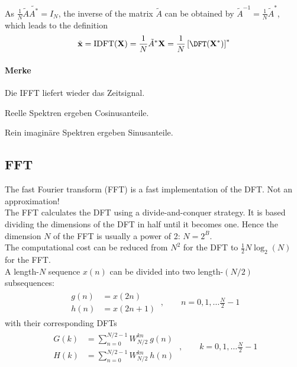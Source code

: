 As $\frac{1}{N} \tilde{A} \tilde{A^*} = I_N$, the inverse of the matrix
$\tilde{A}$ can be obtained by $\tilde{A}^{-1} = \frac{1}{N} \tilde{A}^*$,
which leads to the definition
\begin{equation*}
	\tilde{\mathbf{x}} = \text{IDFT}(\mathbf{X}) = \frac{1}{N} \tilde{A}^* \mathbf{X} = \frac{1}{N}\left[ \DFT(\mathbf{X}^*) \right] ^*
\end{equation*}

\paragraph{Merke}

Die IFFT liefert wieder das Zeitsignal.

Reelle Spektren ergeben Cosinusanteile.

Rein imaginäre Spektren ergeben Sinusanteile.

\subsection{FFT}
The fast Fourier transform (FFT) is a fast implementation of the DFT.
Not an approximation! \\

The FFT calculates the DFT using a divide-and-conquer strategy. It is based
dividing the dimensions of the DFT in half until it becomes one. Hence
the dimension $N$ of the FFT is usually a power of 2: $N = 2^B$. \\

The computational cost can be reduced from $N^2$ for the DFT to $\frac{1}{2} N \log_2 (N)$ for the FFT. \\

A length-$N$ sequence $x(n)$ can be divided into two length-$(N/2)$ subsequences:
\begin{align*}
	\begin{array}{ll}
		g(n) &= x(2n) \\
		h(n) &= x(2n+1)
	\end{array}
	\:,\qquad n = 0,1,\ldots \frac{N}{2}-1
\end{align*}
with their corresponding DFTs
\begin{align*}
	\begin{array}{ll}
		G(k) &= \sum\limits_{n=0}^{N/2-1} W_{N/2}^{kn} \: g(n) \\
		H(k) &= \sum\limits_{n=0}^{N/2-1} W_{N/2}^{kn} \: h(n)
	\end{array}
	\:,\qquad k=0,1,\ldots \frac{N}{2}-1
\end{align*}

